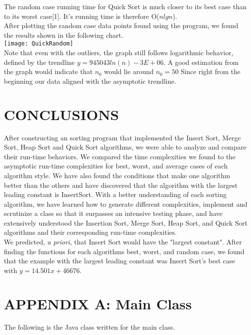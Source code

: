 \documentclass[12pt]{article}
\begin{document}
The random case running time for Quick Sort is much closer to its best case than to its worst case[1]. It's running time is therefore O($nlgn$).\\

After plotting the random case data points found using the program, we found the results shown in the following chart. \\

\texttt{[image: QuickRandom]}\\

Note that even with the outliers, the graph still follows logarithmic behavior, defined by the trendline $y = 945043ln(n)-3E+06$.  A good estimation from the graph would indicate that $n_0$ would lie around $n_0 = 50 $ Since right from the beginning our data aligned with the asymptotic trendline.

\section*{CONCLUSIONS}

After constructing an sorting program that implemented the Insert Sort, Merge Sort, Heap Sort and Quick Sort algorithms, we were able to analyze and compare their run-time behaviors. We compared the time complexities we found to the asymptotic run-time complexities for best, worst, and average cases of each algorithm style. We have also found the conditions that make one algorithm better than the others and have discovered that the algorithm with the largest leading constant is InsertSort. With a better understanding of each sorting algorithm, we have learned how to generate different complexities, implement and scrutinize a class so that it surpasses an intensive testing phase, and have extensively understood the Insertion Sort, Merge Sort, Heap Sort, and Quick Sort algorithms and their corresponding run-time complexities. \\

We predicted, \textit{a priori}, that Insert Sort would have the "largest constant". After finding the functions for each algorithms best, worst, and random case, we found that the example with the largest leading constant was Insert Sort's best case with $y = 14.501x + 46676$.
\pagebreak

\section*{APPENDIX A: Main Class}
The following is the Java class written for the main class. 
\end{document}

